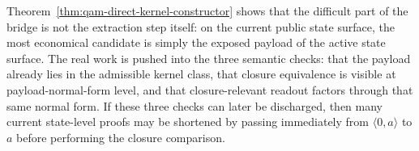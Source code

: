 \begin{remark}\label{rem:qam-direct-kernel-constructor-meaning}
Theorem~\ref{thm:qam-direct-kernel-constructor} shows that the difficult part of the bridge is not the extraction step itself: on the current public state surface, the most economical candidate is simply the exposed payload of the active state surface. The real work is pushed into the three semantic checks: that the payload already lies in the admissible kernel class, that closure equivalence is visible at payload-normal-form level, and that closure-relevant readout factors through that same normal form. If these three checks can later be discharged, then many current state-level proofs may be shortened by passing immediately from $\langle 0,a\rangle$ to $a$ before performing the closure comparison.
\end{remark}


